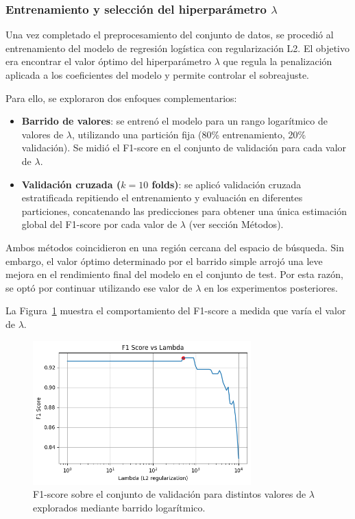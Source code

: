 \documentclass[11pt]{article}
\begin{document}
\subsubsection*{Entrenamiento y selección del hiperparámetro $\lambda$}

Una vez completado el preprocesamiento del conjunto de datos, se procedió al entrenamiento del modelo de regresión logística con regularización L2. El objetivo era encontrar el valor óptimo del hiperparámetro $\lambda$ que regula la penalización aplicada a los coeficientes del modelo y permite controlar el sobreajuste.

Para ello, se exploraron dos enfoques complementarios:

\begin{itemize}
    \item \textbf{Barrido de valores}: se entrenó el modelo para un rango logarítmico de valores de $\lambda$, utilizando una partición fija (80\% entrenamiento, 20\% validación). Se midió el F1-score en el conjunto de validación para cada valor de $\lambda$.
    \item \textbf{Validación cruzada ($k=10$ folds)}: se aplicó validación cruzada estratificada repitiendo el entrenamiento y evaluación en diferentes particiones, concatenando las predicciones para obtener una única estimación global del F1-score por cada valor de $\lambda$ (ver sección Métodos).
\end{itemize}

Ambos métodos coincidieron en una región cercana del espacio de búsqueda. Sin embargo, el valor óptimo determinado por el barrido simple arrojó una leve mejora en el rendimiento final del modelo en el conjunto de test. Por esta razón, se optó por continuar utilizando ese valor de $\lambda$ en los experimentos posteriores.

La Figura~\ref{fig:lambda_search} muestra el comportamiento del F1-score a medida que varía el valor de $\lambda$.

\begin{figure}[H]
    \centering
    \includegraphics[width=0.75\textwidth]{figures/lambda_search.png}
    \caption{F1-score sobre el conjunto de validación para distintos valores de $\lambda$ explorados mediante barrido logarítmico.}
    \label{fig:lambda_search}
\end{figure}
\end{document}

